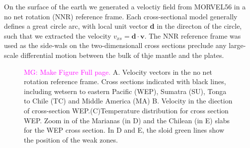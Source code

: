\documentclass[12pt]{article}
\newcommand{\mgnote}[1]{\textcolor{magenta}{MG: #1}}
\begin{document}
On the surface of the earth we generated a veloctiy field from MORVEL56 \citep{GGGE2060} in a no net rotation (NNR) reference frame. Each cross-sectional model generally defines a great circle arc, with local unit vector \textbf{d} in the directon of the circle, such that we extracted the velocity $v_{xs}=\textbf{d}\cdot\textbf{v}$.  The NNR reference frame was used as the side-wals on the two-dimensionall cross sections preclude any large-scale differential motion between the bulk of thje mantle and the plates.

\begin{figure}[H]
\centering
{}
\caption{\mgnote{Make Figure Full page.} A. Velocity vectors in the no net rotation reference frame. Cross sections indicated with black lines, including wetsern to eastern Pacific (WEP), Sumatra (SU), Tonga to Chile (TC) and Middle America (MA) B. Velocity in the diection of cross-section WEP.(C)Temperature distribution for cross section WEP. Zoom in of the Marianas (in D) and the Chilean (in E) slabs for the WEP cross section. In D and E, the sloid green lines show the position of the weak zones.}
\label{fig:xsection2sumatra}
\end{figure}
\end{document}
